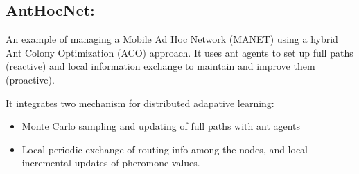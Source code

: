 \subsection*{AntHocNet:} An example of managing a Mobile Ad Hoc Network (MANET) using a hybrid Ant Colony Optimization (ACO) approach. It uses ant agents to set up full paths (reactive) and local information exchange to maintain and improve them (proactive).

It integrates two mechanism for distributed adapative learning:
\begin{itemize}
    \item Monte Carlo sampling and updating of full paths with ant agents 
    \item Local periodic exchange of routing info among the nodes, and local incremental updates 
    of pheromone values.
\end{itemize}
